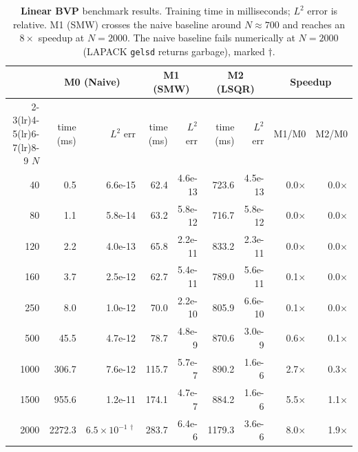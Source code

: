 \documentclass[11pt,a4paper]{article}
\begin{document}
\begin{table}[h]
\centering
\caption{\textbf{Linear BVP} benchmark results. Training time in milliseconds;
$L^{2}$ error is relative. M1 (SMW) crosses the naive baseline around $N\approx 700$
and reaches an $8\times$ speedup at $N=2000$. The naive baseline fails
numerically at $N=2000$ (LAPACK \texttt{gelsd} returns garbage), marked $\dagger$.}
\label{tab:bench-linear}
\small
\begin{tabular}{r r r r r r r r r}
\toprule
       & \multicolumn{2}{c}{M0 (Naive)} & \multicolumn{2}{c}{M1 (SMW)} & \multicolumn{2}{c}{M2 (LSQR)} & \multicolumn{2}{c}{Speedup} \\
\cmidrule(lr){2-3}\cmidrule(lr){4-5}\cmidrule(lr){6-7}\cmidrule(lr){8-9}
$N$    & time (ms) & $L^{2}$ err & time (ms) & $L^{2}$ err & time (ms) & $L^{2}$ err & M1/M0 & M2/M0\\
\midrule
   40 &      0.5 & 6.6e-15 &    62.4 & 4.6e-13 &   723.6 & 4.5e-13 &  0.0$\times$ & 0.0$\times$ \\
   80 &      1.1 & 5.8e-14 &    63.2 & 5.8e-12 &   716.7 & 5.8e-12 &  0.0$\times$ & 0.0$\times$ \\
  120 &      2.2 & 4.0e-13 &    65.8 & 2.2e-11 &   833.2 & 2.3e-11 &  0.0$\times$ & 0.0$\times$ \\
  160 &      3.7 & 2.5e-12 &    62.7 & 5.4e-11 &   789.0 & 5.6e-11 &  0.1$\times$ & 0.0$\times$ \\
  250 &      8.0 & 1.0e-12 &    70.0 & 2.2e-10 &   805.9 & 6.6e-10 &  0.1$\times$ & 0.0$\times$ \\
  500 &     45.5 & 4.7e-12 &    78.7 & 4.8e-9  &   870.6 & 3.0e-9  &  0.6$\times$ & 0.1$\times$ \\
 1000 &    306.7 & 7.6e-12 &   115.7 & 5.7e-7  &   890.2 & 1.6e-6  &  2.7$\times$ & 0.3$\times$ \\
 1500 &    955.6 & 1.2e-11 &   174.1 & 4.7e-7  &   884.2 & 1.6e-6  &  5.5$\times$ & 1.1$\times$ \\
 2000 &   2272.3 & $6.5{\times}10^{-1\,\dagger}$  &   283.7 & 6.4e-6  &  1179.3 & 3.6e-6  &  8.0$\times$ & 1.9$\times$ \\
\bottomrule
\end{tabular}
\end{table}
\end{document}
